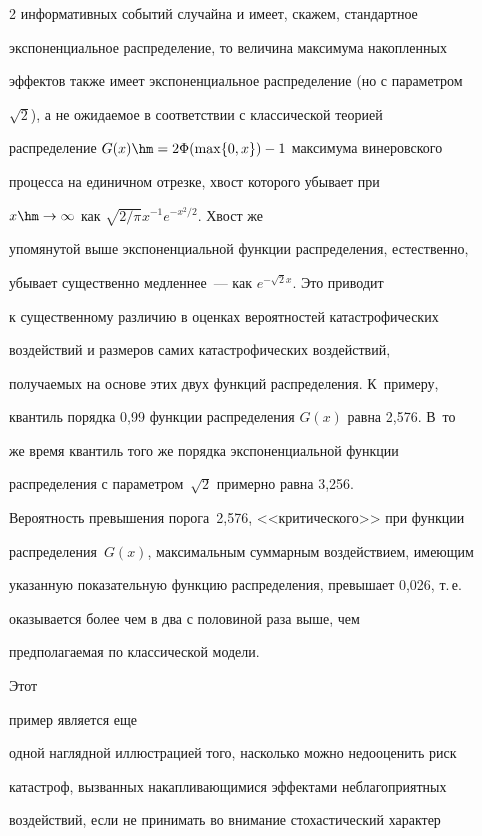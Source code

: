 \begin{multicols}{2}
информативных событий случайна и имеет, скажем, стандартное


экспоненциальное распределение, то величина максимума накопленных


эффектов также имеет экспоненциальное распределение (но с параметром


$\sqrt{2}$), а не ожидаемое в соответствии с классической теорией


распределение $G(x)\hm=2\Phi(\max\{0,x\})-1$ максимума винеровского


процесса на единичном отрезке, хвост которого убывает при


$x\hm\to\infty$ как $\sqrt{2/\pi}x^{-1}e^{-x^2/2}$.  Хвост же


упомянутой выше экспоненциальной функции распределения, естественно,


убывает существенно медленнее~--- как $e^{-\sqrt{2}x}$. Это приводит


к существенному различию в оценках вероятностей катастрофических


воздействий и размеров самих катастрофических воздействий,


получаемых на основе этих двух функций распределения. К~примеру,


квантиль порядка 0,99 функции распределения $G(x)$ равна 2,576. В~то


же время квантиль того же порядка экспоненциальной функции


распределения с па\-ра\-мет\-ром~$\sqrt{2}$ примерно равна 3,256.


Вероятность превышения порога~2,576, <<критического>> при функции


распределения~$G(x)$, максимальным суммарным воздействием, име\-ющим


указанную показательную функцию распределения, превышает 0,026, т.\,е.\ 


оказывается более чем в два с половиной раза выше, чем


предполагаемая по классической модели. 





Этот %


пример является еще


одной наглядной иллюстрацией того, насколько можно недооценить риск


ка\-та\-ст\-роф, вызванных накапливающимися эффектами неблагоприятных


воздействий, если не принимать во внимание стохастический характер



\end{multicols}
